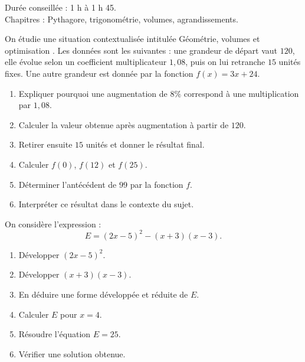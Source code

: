 \documentclass[11pt,a4paper]{article}
\newcounter{exercice}
\begin{document}
\begin{objectif}
Durée conseillée : 1 h à 1 h 45.\\
Chapitres : Pythagore, trigonométrie, volumes, agrandissements.
\end{objectif}
\begin{exercice}
On étudie une situation contextualisée intitulée \og Géométrie, volumes et optimisation \fg. Les données sont les suivantes : une grandeur de départ vaut $120$, elle évolue selon un coefficient multiplicateur $1{,}08$, puis on lui retranche $15$ unités fixes. Une autre grandeur est donnée par la fonction $f(x)=3x+24$.
\begin{enumerate}
  \item Expliquer pourquoi une augmentation de $8\%$ correspond à une multiplication par $1{,}08$.
  \item Calculer la valeur obtenue après augmentation à partir de $120$.
  \item Retirer ensuite $15$ unités et donner le résultat final.
  \item Calculer $f(0)$, $f(12)$ et $f(25)$.
  \item Déterminer l'antécédent de $99$ par la fonction $f$.
  \item Interpréter ce résultat dans le contexte du sujet.
\end{enumerate}
\end{exercice}

\begin{exercice}
On considère l'expression :
\[
E=(2x-5)^2-(x+3)(x-3).
\]
\begin{enumerate}
  \item Développer $(2x-5)^2$.
  \item Développer $(x+3)(x-3)$.
  \item En déduire une forme développée et réduite de $E$.
  \item Calculer $E$ pour $x=4$.
  \item Résoudre l'équation $E=25$.
  \item Vérifier une solution obtenue.
\end{enumerate}
\end{exercice}
\end{document}
